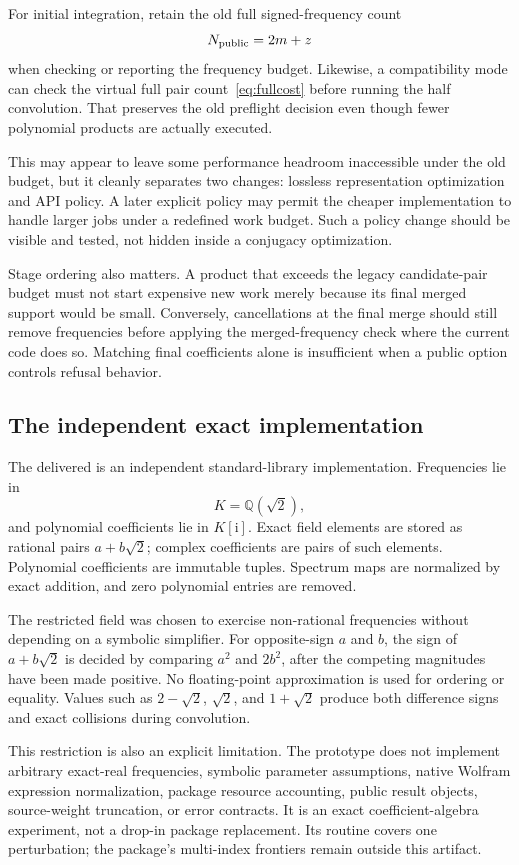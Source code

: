 \documentclass[11pt,letterpaper]{article}
\newcommand{\code}[1]{\texttt{\small\detokenize{#1}}}
\newcommand{\QQ}{\mathbb Q}
\newcommand{\ii}{\mathrm i}
\begin{document}
For initial integration, retain the old full signed-frequency count
\[
 N_{\rm public}=2m+z
\]
when checking or reporting the frequency budget. Likewise, a compatibility mode can check the virtual full pair count~\eqref{eq:fullcost} before running the half convolution. That preserves the old preflight decision even though fewer polynomial products are actually executed.

This may appear to leave some performance headroom inaccessible under the old budget, but it cleanly separates two changes: lossless representation optimization and API policy. A later explicit policy may permit the cheaper implementation to handle larger jobs under a redefined work budget. Such a policy change should be visible and tested, not hidden inside a conjugacy optimization.

Stage ordering also matters. A product that exceeds the legacy candidate-pair budget must not start expensive new work merely because its final merged support would be small. Conversely, cancellations at the final merge should still remove frequencies before applying the merged-frequency check where the current code does so. Matching final coefficients alone is insufficient when a public option controls refusal behavior.

\subsection{The independent exact implementation}
The delivered \code{code/hermitian_fourier.py} is an independent standard-library implementation. Frequencies lie in
\[
 K=\QQ(\sqrt2),
\]
and polynomial coefficients lie in \(K[\ii]\). Exact field elements are stored as rational pairs \(a+b\sqrt2\); complex coefficients are pairs of such elements. Polynomial coefficients are immutable tuples. Spectrum maps are normalized by exact addition, and zero polynomial entries are removed.

The restricted field was chosen to exercise non-rational frequencies without depending on a symbolic simplifier. For opposite-sign \(a\) and \(b\), the sign of \(a+b\sqrt2\) is decided by comparing \(a^2\) and \(2b^2\), after the competing magnitudes have been made positive. No floating-point approximation is used for ordering or equality. Values such as \(2-\sqrt2\), \(\sqrt2\), and \(1+\sqrt2\) produce both difference signs and exact collisions during convolution.

This restriction is also an explicit limitation. The prototype does not implement arbitrary exact-real frequencies, symbolic parameter assumptions, native Wolfram expression normalization, package resource accounting, public result objects, source-weight truncation, or error contracts. It is an exact coefficient-algebra experiment, not a drop-in package replacement. Its \code{lagrange_single} routine covers one perturbation; the package's multi-index frontiers remain outside this artifact.
\end{document}
